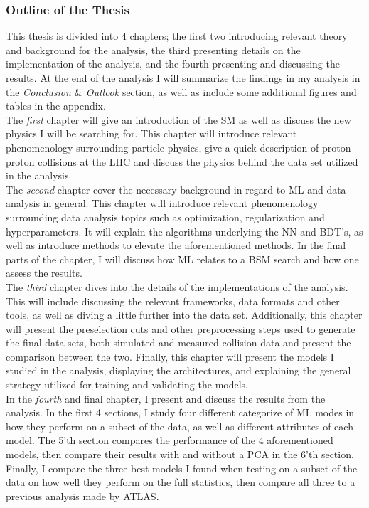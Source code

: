 \subsubsection*{Outline of the Thesis}
This thesis is divided into 4 chapters; the first two introducing relevant theory and background for the analysis, the third presenting 
details on the implementation of the analysis, and the fourth presenting and discussing the results. At the end of the analysis I will summarize 
the findings in my analysis in the \emph{Conclusion $\&$ Outlook} section, as well as include some additional figures and tables 
in the appendix. 
\\
The \emph{first} chapter will give an introduction of the \ac{SM} as well as discuss the new physics I will be searching for. This chapter will 
introduce relevant phenomenology surrounding particle physics, give a quick description of proton-proton collisions at the \ac{LHC} and discuss 
the physics behind the data set utilized in the analysis. 
\\
The \emph{second} chapter cover the necessary background in regard to \ac{ML} and data analysis in general. This chapter will introduce relevant phenomenology
surrounding data analysis topics such as optimization, regularization and hyperparameters. It will explain the algorithms underlying the \ac{NN} and 
\ac{BDT}'s, as well as introduce methods to elevate the aforementioned methods. In the final parts of the chapter, I will discuss how \ac{ML} relates to 
a \ac{BSM} search and how one assess the results.
\\
The \emph{third} chapter dives into the details of the implementations of the analysis. This will include discussing the relevant frameworks, data formats and 
other tools, as well as diving a little further into the data set. Additionally, this chapter will present the preselection cuts and other preprocessing steps
used to generate the final data sets, both simulated and measured collision data and present the comparison between the two. Finally, this chapter will present the 
models I studied in the analysis, displaying the architectures, and explaining the general strategy utilized for training and validating the models.
\\
In the \emph{fourth} and final chapter, I present and discuss the results from the analysis. In the first 4 sections, I study four different categorize of \ac{ML} modes in how they 
perform on a subset of the data, as well as different attributes of each model. The 5'th section compares the performance of the 4 aforementioned models, then compare 
their results with and without a \ac{PCA} in the 6'th section. Finally, I compare the three best models I found when testing on a subset of the data on how well they perform 
on the full statistics, then compare all three to a previous analysis made by ATLAS.



